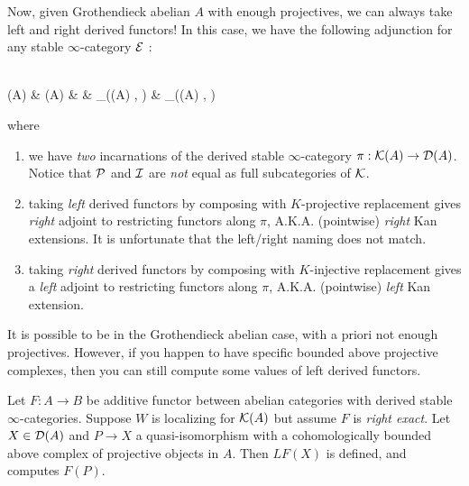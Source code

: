 \documentclass{article}
\begin{document}
Now, given Grothendieck abelian $A$ with enough projectives,
we can always take left and right derived functors!
In this case, we have the following adjunction for any
stable $\infty$-category $\mathcal{E}$ : 
\begin{cd}
  {} \\
	{(A)} & {(A)} & \rightsquigarrow & {_{}((A) , )} & {_{}((A) , )} \\
	{}
	\arrow["\sim"', from=1-1, to=2-1]
	\arrow["p", shift left=2, from=1-1, to=2-2]
	\arrow["\bot"{marking, allow upside down}, draw=none, from=1-1, to=2-2]
	\arrow[shift left=2, from=2-2, to=1-1]
	\arrow["\pi"{description}, from=2-2, to=2-1]
	\arrow[shift right=2, from=2-2, to=3-1]
	\arrow["{F \mapsto RF = F i}", shift left=5, from=2-4, to=2-5]
	\arrow["{F \mapsto LF = F p}"', shift right=5, from=2-4, to=2-5]
	\arrow["\bot"{description}, shift left=3, draw=none, from=2-4, to=2-5]
	\arrow["\bot"{description}, shift right=3, draw=none, from=2-4, to=2-5]
	\arrow["{\pi^*}"{description}, from=2-5, to=2-4]
	\arrow["\sim", from=3-1, to=2-1]
	\arrow["i"', shift right=2, from=3-1, to=2-2]
	\arrow["\bot"{marking, allow upside down}, draw=none, from=3-1, to=2-2]
\end{cd}
where \begin{enumerate}
  \item we have \emph{two} incarnations of the derived stable $\infty$-category
  $\pi : \mathcal{K}(A) \to \mathcal{D}(A)$.
  Notice that $\mathcal{P}$ and $\mathcal{I}$ are \emph{not} equal as 
  full subcategories of $\mathcal{K}$.
  \item taking \emph{left} derived functors by composing with $K$-projective
  replacement gives \emph{right} adjoint to restricting functors along $\pi$,
  A.K.A. (pointwise) \emph{right} Kan extensions. 
  It is unfortunate that the left/right naming does not match.
  \item taking \emph{right} derived functors by composing with $K$-injective
  replacement gives a \emph{left} adjoint to restricting functors along $\pi$,
  A.K.A. (pointwise) \emph{left} Kan extension.
\end{enumerate}
It is possible to be in the Grothendieck abelian case,
with a priori not enough projectives.
However, if you happen to have specific bounded above
projective complexes, then you can still compute some values of 
left derived functors.
\begin{prop}
  
  Let $F : A \to B$ be additive functor between abelian categories
  with derived stable $\infty$-categories.
  Suppose $W$ is localizing for $\mathcal{K}(A)$ but assume $F$ is \emph{right exact}.
  Let $X \in \mathcal{D}(A)$ and $P \to X$ a quasi-isomorphism
  with a cohomologically bounded above complex of projective objects in $A$.
  Then $LF(X)$ is defined, and computes $F(P)$.
\end{prop}
\end{document}
